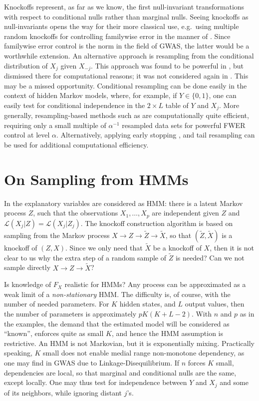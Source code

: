 \documentclass[article,lineno]{biometrika}
\begin{document}
	Knockoffs represent, as far as we know, the first null-invariant transformations with respect to conditional nulls rather than marginal nulls.
	Seeing knockoffs as null-invariants opens the way for their more classical use, e.g.\ using multiple random knockoffs for controlling familywise error in the manner of \cite{Westfall1993}. Since familywise error control is the norm in the field of GWAS, the latter would be a worthwhile extension. 
	An alternative approach is resampling from the conditional distribution of $X_j$ given $X_{-j}$. 
	This approach was found to be powerful in \cite[Fig.3]{CandesPanninggoldmodelX2018}, but dismissed there for computational reasons; it was not considered again in \cite{SesiaGenehuntinghidden}. 
	This may be a missed opportunity. 
	Conditional resampling can be done easily in the context of hidden Markov models, where, for example, if $Y\in \{0,1\}$, one can easily test for conditional independence in the $2\times L$ table of $Y$ and $X_j$. 
	More generally, resampling-based methods such as \cite{Westfall1993} are computationally quite efficient, requiring only a small multiple of $\alpha^{-1}$ resampled data sets for powerful FWER control at level $\alpha$. 
	Alternatively, applying early stopping \citep[e.g.][]{jiang2012statistical}, and tail resampling \cite[e.g.][]{yu2011efficient} can be used for additional computational efficiency.
		
	
	
	\section{On Sampling from HMMs}
	In \cite{SesiaGenehuntinghidden} the explanatory variables are considered as HMM: there is a latent Markov process $Z$, such that the observations $X_1,\dots,X_p$ are independent given $Z$ and ${\mathcal L}(X_j|Z)={\mathcal L}(X_j|Z_j)$.
	The knockoff construction algorithm is based on sampling from the Markov process $X\to Z\to \tilde Z\to \tilde X$, so that $(\tilde Z,\tilde X)$ is a knockoff of $(Z,X)$.
	Since we only need that $\tilde{X}$ be a knockoff of $X$, then it is not clear to us why the extra step of a random sample of $\tilde Z$ is needed? Can we not sample directly $X\to Z\to \tilde X$?
	
	Is knowledge of $F_X$ realistic for HMMs?
	Any process can be approximated as a weak limit of a \emph{non-stationary} HMM.
	The difficulty is, of course, with the number of needed parameters.
	For $K$ hidden states, and $L$ output values, then the number of parameters is approximately $p K(K+L-2)$.
	With $n$ and $p$ as in the examples, the demand that the estimated model will be considered as ``known'', enforces quite as small $K$, and hence the HMM assumption is restrictive.
	An HMM is not Markovian, but it is exponentially mixing.
	Practically speaking, $K$ small does not enable medial range non-monotone dependency, as one may find in GWAS due to Linkage-Disequilibrium.
	If $n$ forces $K$ small, dependencies are local, so that marginal and conditional nulls are the same, except locally.
	One may thus test for independence between $Y$ and $X_j$ and some of its neighbors, while ignoring distant $j$'s.
	
\end{document}
